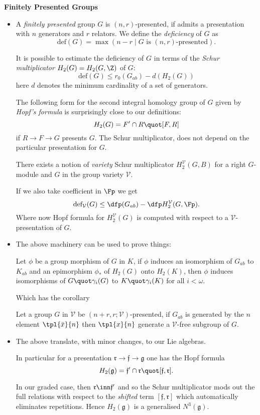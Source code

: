 \documentclass[a4paper,11pt,german,english]{report}
\begin{document}
\newpage
\indent
{\bf Finitely Presented Groups}
\begin{itemize}
\item[]A {\em finitely presented} group $G$ is $(n,r)$-presented, if admits a presentation
with $n$ generators and $r$ relators. We define the {\em deficiency} of $G$ as
$$\mathrm{def}(G)=\max(n-r\mid G\,\,\text{is $(n, r)$-presented}).$$

It is possible to estimate the deficiency of $G$ in terms of the {\em Schur multiplicator}
$H_{2}(G)=H_{2}(G,\Z)$ of $G$: $$\text{def}(G)\leq r_{0}(G_{ab})-d(H_{2}(G))$$
here $d$ denotes the minimum cardinality of a set of generators.

The following form for the second integral homology group of $G$ given by {\em Hopf's
formula} is surprisingly close to our definitions:
$$H_{2}(G)=F^{\prime}\cap R\quot [F,R]$$
if $R\to F\to G$ presents $G$. The Schur multiplicator, does not depend on the particular
presentation for $G$.

There exists a notion of {\em variety} Schur multiplicator
$H^{\mathcal{V}}_{2}(G,B)$ for a right $G$-module and $G$ in the group variety
$\mathcal{V}$.

If we also take coefficient in $\Fp$ we get
$$\mathrm{def_{\mathcal{V}}}(G)\leq\dfp(G_{ab})-\dfp H_{2}^{\mathcal{V}}(G,\Fp).$$
Where now Hopf formula for $H_{2}^{\mathcal{V}}(G)$ is computed with respect
to a $\mathcal{V}$-presentation of $G$.

\item[]The above machinery can be used to prove things:
\begin{teo*}
Let $\phi$ be a group morphism of $G$ in $K$, if $\phi$
induces an isomorphism of $G_{ab}$ to $K_{ab}$ and an epimorphism
$\phi_{*}$ of $H_{2}(G)$ onto $H_{2}(K)$, then $\phi$ induces
isomorphisms of $G\quot\gamma_{i}(G)$ to $K\quot\gamma_{i}(K)$ for all
$i<\omega$.
\end{teo*}
Which has the corollary
\begin{teo*}
Let a group $G$ in $\mathcal{V}$ be $(n+r,r;\mathcal{V})$-presented, if $G_{ab}$
is generated by the $n$ element $\tpl{\bar x}{n}$ then $\tpl{x}{n}$ generate a $\mathcal{V}$-free subgroup of $G$.
\end{teo*}

\item[]The above translate, with minor changes, to our
Lie algebras.

In particular for a presentation $\mathfrak{r}\to\mathfrak{f}\to\mathfrak{g}$ one has the
Hopf formula $$H_{2}(\mathfrak{g})=\mathfrak{f}^{\prime}\cap\mathfrak{r}\quot[\mathfrak{f},
\mathfrak{r}].$$

In our graded case, then $\mathfrak{r}\inn\mathfrak{f}^{\prime}$ and
so the Schur multiplicator mods out the full relations with respect to the {\em shifted} term
$[\mathfrak{f},\mathfrak{r}]$ which automatically eliminates repetitions. Hence $H_{2}(\mathfrak{g})$ is a generalised $N^{3}(\mathfrak{g})$.
\end{itemize}
\end{document}
